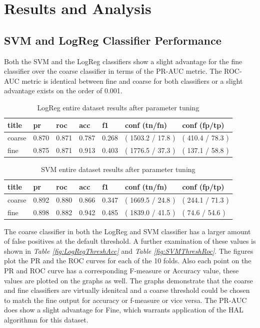 \documentclass[ms]{nuthesis}
\begin{document}
\chapter{Results and Analysis}\label{chap:aenied}
\section{SVM and LogReg Classifier Performance}
\par Both the SVM and the LogReg classifiers show a slight advantage for the fine
classifier over the coarse classifier in terms of the PR-AUC metric. The ROC-AUC
metric is identical between fine and coarse for both classifiers or a slight
advantage exists on the order of 0.001.


\FloatBarrier
\begin{table}[H]
\centering
\begin{tabular}{|l||l||l||l||l||l||l|}\toprule
title & pr & roc & acc & f1 & conf (tn/fn) & conf (fp/tp) \\ \midrule
coarse & 0.870 & 0.871 & 0.787 & 0.268 & ( 1503.2 / 17.8 ) & ( 410.4 / 78.3 ) \\
fine & 0.875 & 0.871 & 0.913 & 0.403 & ( 1776.5 / 37.3 ) & ( 137.1 / 58.8 ) \\ \bottomrule
\end{tabular}
\caption{LogReg entire dataset results after parameter tuning}
\label{tab:LogRegAll-Wt23}
\end{table}
\FloatBarrier


\FloatBarrier
\begin{table}[H]
\centering
\begin{tabular}{|l||l||l||l||l||l||l|}\toprule
title & pr & roc & acc & f1 & conf (tn/fn) & conf (fp/tp) \\ \midrule
coarse & 0.892 & 0.880 & 0.866 & 0.347 & ( 1669.5 / 24.8 ) & ( 244.1 / 71.3 ) \\
fine & 0.898 & 0.882 & 0.942 & 0.485 & ( 1839.0 / 41.5 ) & ( 74.6 / 54.6 ) \\ \bottomrule
\end{tabular}
\caption{SVM entire dataset results after parameter tuning}
\label{tab:SVM-All}
\end{table}
\FloatBarrier

\par The coarse classifier in both the LogReg and SVM classifier has a larger
 amount of false positives at the default threshold. A further examination of these
 values is shown in \textit{Table \ref{fig:LogRegThreshAcc}} and
 \textit{Table \ref{fig:SVMThreshRoc}}. The figures plot the PR and the ROC
 curves for each of the 10 folds. Also each point on the PR and ROC curve has a
 corresponding F-measure or Accuracy value, these values are plotted on the graphs
 as well. The graphs demonstrate that the coarse and fine classifiers are virtually
 idenitcal and a coarse threshold could be chosen to match the fine output for
 accuracy or f-measure or vice versa. The PR-AUC does show a slight advantage for Fine,
 which warrants application of the HAL algorithmn for this dataset.
\end{document}
